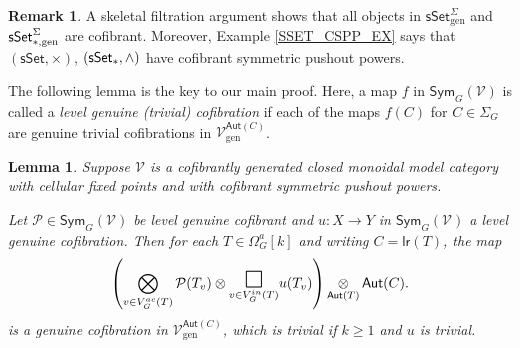 \documentclass[a4paper,10pt
,draft
]{article}%
\numberwithin{equation}{section}
\numberwithin{figure}{section}
\newtheorem{lemma}[equation]{Lemma}%
\theoremstyle{definition} %
\newtheorem{remark}[equation]{Remark}%
\newcommand{\Sym}{\ensuremath{\mathsf{Sym}}}%
\newcommand{\V}{\ensuremath{\mathcal V}}
\renewcommand{\P}{\ensuremath{\mathcal P}}
\newcommand{\1}{\ensuremath{\mathbbm 1}}%
\begin{document}
\begin{remark}\label{ALLCOF REM}
        A skeletal filtration argument shows that all objects in
        $\mathsf{sSet}^{\Sigma}_{\text{gen}}$ and
        $\mathsf{sSet}^{\Sigma}_{\**,\text{gen}}$
        are cofibrant.
        Moreover, Example \ref{SSET_CSPP_EX} says that $(\mathsf{sSet},\times)$, $(\mathsf{sSet}_{\**},\wedge)$ have
        cofibrant symmetric pushout powers.
\end{remark}


The following lemma is the key to our main proof. 
Here, a map $f$ in 
$\mathsf{Sym}_G(\mathcal{V})$ is called
a \textit{level genuine (trivial) cofibration} if each of the maps
$f(C)$ for $C \in \Sigma_G$ are genuine trivial cofibrations in
$\mathcal{V}^{\mathsf{Aut}(C)}_{\text{gen}}$.

\begin{lemma}\label{EXMAINLEM LEM}
	Suppose $\mathcal{V}$ is a cofibrantly generated closed monoidal model category
	with cellular fixed points and
	with cofibrant symmetric pushout powers.
	
	Let $\mathcal{P} \in \mathsf{Sym}_G(\mathcal{V})$
	be level genuine cofibrant
	and  
	$u: X \to Y$ in $\Sym_G(\V)$ a level genuine cofibration. 
	Then for each $T \in \Omega^a_G[k]$ and writing
	$C = \mathsf{lr}(T)$, the map	
\begin{equation}\label{EXMAINLEM EQ}
	\left(
		\bigotimes\limits_{v \in V_{G}^{ac}(T)}\P(T_v) \otimes
		\underset{v \in V_{G}^{in}(T)}
	{\mathlarger{\mathlarger{\mathlarger{\square}}}}
		u(T_v)
	\right) 
	\mathop{\otimes}\limits_{\mathsf{Aut}(T)} \mathsf{Aut}(C).
\end{equation}
	is a genuine cofibration in 
	$\mathcal{V}^{\mathsf{Aut}(C)}_{\text{gen}}$,
	which is trivial if $k \geq 1$ and $u$ is trivial.	
\end{lemma}
\end{document}

